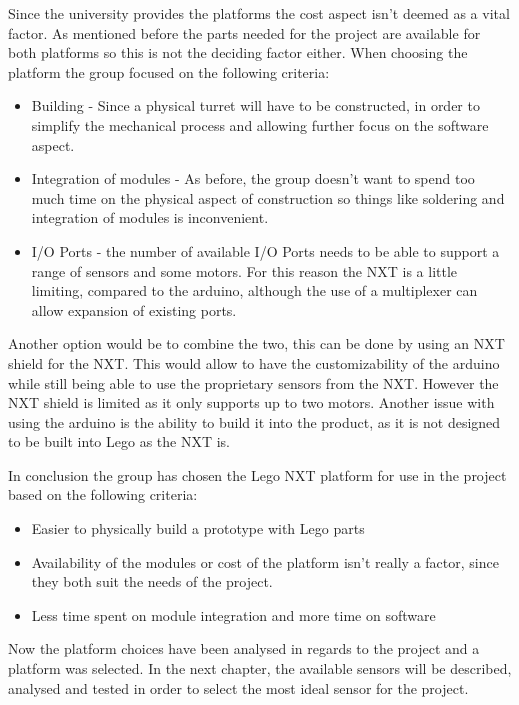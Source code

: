 Since the university provides the platforms the cost aspect isn't deemed as a
vital factor. As mentioned before the parts needed for the project are
available for both platforms so this is not the deciding factor either. When
choosing the platform the group focused on the following criteria:
\begin{itemize}
  \item Building - Since a physical turret will have to be constructed, in
  order to simplify the mechanical process and allowing further focus on the
  software aspect.
  \item Integration of modules - As before, the group doesn't want to spend too
  much time on the physical aspect of construction so things like soldering and
  integration of modules is inconvenient.
  \item I/O Ports - the number of available I/O Ports needs to be able to
  support a range of sensors and some motors. For this reason the NXT is a
  little limiting, compared to the arduino, although the use of a multiplexer
  can allow expansion of existing ports.
\end{itemize}

Another option would be to combine the two, this can be done by using an NXT
shield for the NXT. This would allow to have the customizability of the arduino
while still being able to use the proprietary sensors from the NXT. However the
NXT shield is limited as it only supports up to two motors. Another issue with
using the arduino is the ability to build it into the product, as it is not
designed to be built into Lego as the NXT is.\nl

In conclusion the group has chosen the Lego NXT platform for use in the project
based on the following criteria:
\begin{itemize}
  \item Easier to physically build a prototype with Lego parts
  \item Availability of the modules or cost of the platform isn't really a
  factor, since they both suit the needs of the project.
  \item Less time spent on module integration and more time on software
\end{itemize}

Now the platform choices have been analysed in regards to the project and a
platform was selected. In the next chapter, the available sensors will be
described, analysed and tested in order to select the most ideal sensor for the
project.